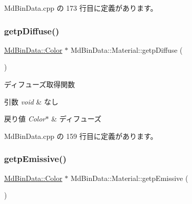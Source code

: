  Md\+Bin\+Data.\+cpp の 173 行目に定義があります。

\mbox{\label{class_md_bin_data_1_1_material_a3a66da1fbf79515b1bdff35b0278eb19}} 
\subsubsection{\texorpdfstring{getp\+Diffuse()}{getpDiffuse()}}
{\footnotesize\ttfamily \mbox{\hyperlink{class_md_bin_data_1_1_color}{Md\+Bin\+Data\+::\+Color}} $\ast$ Md\+Bin\+Data\+::\+Material\+::getp\+Diffuse (\begin{DoxyParamCaption}{ }\end{DoxyParamCaption})}



ディフューズ取得関数 


\begin{DoxyParams}{引数}
{\em void} & なし \\
\hline
\end{DoxyParams}

\begin{DoxyRetVals}{戻り値}
{\em Color$\ast$} & ディフューズ \\
\hline
\end{DoxyRetVals}


 Md\+Bin\+Data.\+cpp の 159 行目に定義があります。

\mbox{\label{class_md_bin_data_1_1_material_aa486af195c8862860ec61245e3933a64}} 
\subsubsection{\texorpdfstring{getp\+Emissive()}{getpEmissive()}}
{\footnotesize\ttfamily \mbox{\hyperlink{class_md_bin_data_1_1_color}{Md\+Bin\+Data\+::\+Color}} $\ast$ Md\+Bin\+Data\+::\+Material\+::getp\+Emissive (\begin{DoxyParamCaption}{ }\end{DoxyParamCaption})}



